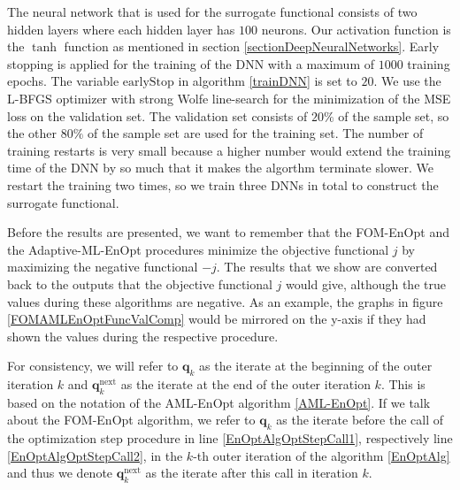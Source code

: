 The neural network that is used for the surrogate functional consists of two hidden layers where each hidden layer has $100$ neurons. Our activation function is the $\tanh$ function as mentioned in section \ref{sectionDeepNeuralNetworks}. Early stopping is applied for the training of the DNN with a maximum of $1000$ training epochs. The variable $\mathrm{earlyStop}$ in algorithm \ref{trainDNN} is set to $20$. We use the L-BFGS optimizer with strong Wolfe line-search for the minimization of the MSE loss on the validation set. The validation set consists of $20\%$ of the sample set, so the other $80\%$ of the sample set are used for the training set. The number of training restarts is very small because a higher number would extend the training time of the DNN by so much that it makes the algorthm terminate slower. We restart the training two times, so we train three DNNs in total to construct the surrogate functional.

Before the results are presented, we want to remember that the FOM-EnOpt and the Adaptive-ML-EnOpt procedures minimize the objective functional $j$ by maximizing the negative functional $-j$. The results that we show are converted back to the outputs that the objective functional $j$ would give, although the true values during these algorithms are negative. As an example, the graphs in figure \ref{FOMAMLEnOptFuncValComp} would be mirrored on the y-axis if they had shown the values during the respective procedure.

For consistency, we will refer to $\mathbf{q}_k$ as the iterate at the beginning of the outer iteration $k$ and $\mathbf{q}^\mathrm{next}_k$ as the iterate at the end of the outer iteration $k$. This is based on the notation of the AML-EnOpt algorithm \ref{AML-EnOpt}. If we talk about the FOM-EnOpt algorithm, we refer to $\mathbf{q}_k$ as the iterate before the call of the optimization step procedure in line \ref{EnOptAlgOptStepCall1}, respectively line \ref{EnOptAlgOptStepCall2}, in the $k$-th outer iteration of the algorithm \ref{EnOptAlg} and thus we denote $\mathbf{q}^\mathrm{next}_k$ as the iterate after this call in iteration $k$.

